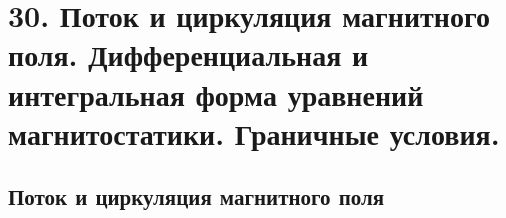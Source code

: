 \section*{30. Поток и циркуляция магнитного поля. Дифференциальная и интегральная
форма уравнений магнитостатики. Граничные условия.}

\subsection*{Поток и циркуляция магнитного поля}


 


